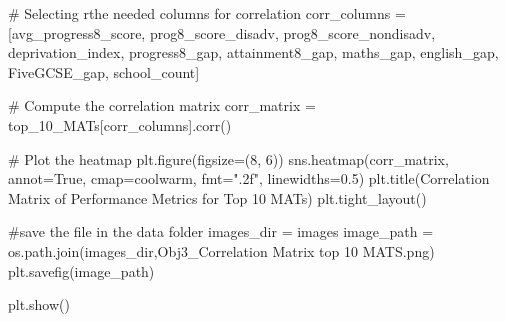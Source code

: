 \documentclass[
  letterpaper,
  DIV=11,
  numbers=noendperiod]{scrartcl}
\newenvironment{Shaded}{\begin{snugshade}}{\end{snugshade}}
\newcommand{\CommentTok}[1]{\textcolor[rgb]{0.37,0.37,0.37}{#1}}
\newcommand{\DecValTok}[1]{\textcolor[rgb]{0.68,0.00,0.00}{#1}}
\newcommand{\FloatTok}[1]{\textcolor[rgb]{0.68,0.00,0.00}{#1}}
\newcommand{\NormalTok}[1]{\textcolor[rgb]{0.00,0.23,0.31}{#1}}
\newcommand{\OperatorTok}[1]{\textcolor[rgb]{0.37,0.37,0.37}{#1}}
\newcommand{\StringTok}[1]{\textcolor[rgb]{0.13,0.47,0.30}{#1}}
\newcommand{\VariableTok}[1]{\textcolor[rgb]{0.07,0.07,0.07}{#1}}
\begin{document}
\begin{Shaded}
\begin{Highlighting}[]
\CommentTok{\# Selecting rthe needed columns for correlation}
\NormalTok{corr\_columns }\OperatorTok{=}\NormalTok{ [}\StringTok{\textquotesingle{}avg\_progress8\_score\textquotesingle{}}\NormalTok{, }\StringTok{\textquotesingle{}prog8\_score\_disadv\textquotesingle{}}\NormalTok{, }
                \StringTok{\textquotesingle{}prog8\_score\_nondisadv\textquotesingle{}}\NormalTok{, }\StringTok{\textquotesingle{}deprivation\_index\textquotesingle{}}\NormalTok{, }\StringTok{\textquotesingle{}progress8\_gap\textquotesingle{}}\NormalTok{, }\StringTok{\textquotesingle{}attainment8\_gap\textquotesingle{}}\NormalTok{,}
       \StringTok{\textquotesingle{}maths\_gap\textquotesingle{}}\NormalTok{, }\StringTok{\textquotesingle{}english\_gap\textquotesingle{}}\NormalTok{, }\StringTok{\textquotesingle{}FiveGCSE\_gap\textquotesingle{}}\NormalTok{,}
                \StringTok{\textquotesingle{}school\_count\textquotesingle{}}\NormalTok{]}

\CommentTok{\# Compute the correlation matrix}
\NormalTok{corr\_matrix }\OperatorTok{=}\NormalTok{ top\_10\_MATs[corr\_columns].corr()}

\CommentTok{\# Plot the heatmap}
\NormalTok{plt.figure(figsize}\OperatorTok{=}\NormalTok{(}\DecValTok{8}\NormalTok{, }\DecValTok{6}\NormalTok{))}
\NormalTok{sns.heatmap(corr\_matrix, annot}\OperatorTok{=}\VariableTok{True}\NormalTok{, cmap}\OperatorTok{=}\StringTok{\textquotesingle{}coolwarm\textquotesingle{}}\NormalTok{, fmt}\OperatorTok{=}\StringTok{".2f"}\NormalTok{, linewidths}\OperatorTok{=}\FloatTok{0.5}\NormalTok{)}
\NormalTok{plt.title(}\StringTok{\textquotesingle{}Correlation Matrix of Performance Metrics for Top 10 MATs\textquotesingle{}}\NormalTok{)}
\NormalTok{plt.tight\_layout()}

\CommentTok{\#save the file in the data folder}
\NormalTok{images\_dir }\OperatorTok{=} \StringTok{\textquotesingle{}images\textquotesingle{}}
\NormalTok{image\_path }\OperatorTok{=}\NormalTok{ os.path.join(images\_dir,}\StringTok{\textquotesingle{}Obj3\_Correlation Matrix top 10 MATS.png\textquotesingle{}}\NormalTok{)}
\NormalTok{plt.savefig(image\_path)}

\NormalTok{plt.show()}
\end{Highlighting}
\end{Shaded}
\end{document}
